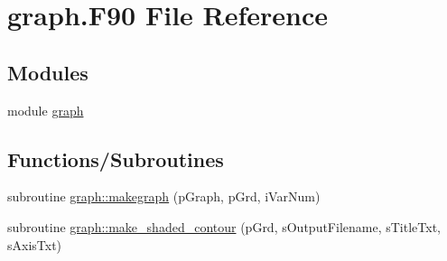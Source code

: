 \hypertarget{graph_8_f90}{
\section{graph.F90 File Reference}
\label{graph_8_f90}
}
\subsection*{Modules}
\begin{DoxyCompactItemize}
\item 
module \hyperlink{namespacegraph}{graph}
\end{DoxyCompactItemize}
\subsection*{Functions/Subroutines}
\begin{DoxyCompactItemize}
\item 
subroutine \hyperlink{namespacegraph_a0d0898b2db62366093b9d8785a1b9d90}{graph::makegraph} (pGraph, pGrd, iVarNum)
\item 
subroutine \hyperlink{namespacegraph_acb4ad4fcaa259060130584cd3de46642}{graph::make\_\-shaded\_\-contour} (pGrd, sOutputFilename, sTitleTxt, sAxisTxt)
\end{DoxyCompactItemize}
